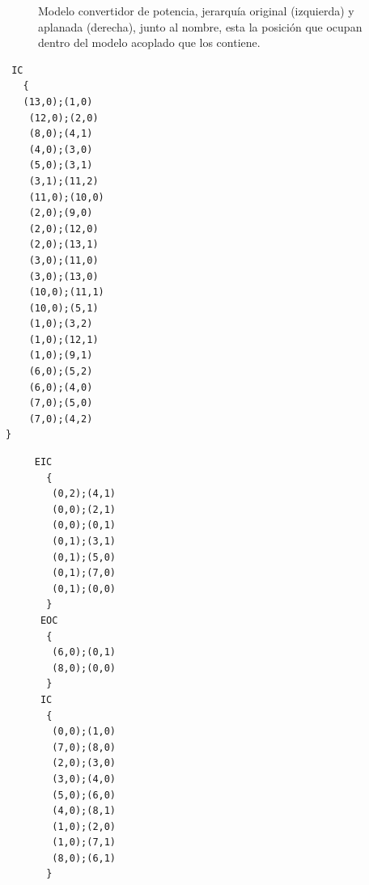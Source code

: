 \documentclass{beamer}
\begin{document}
\begin{frame}[fragile]
\begin{figure}[H]
{\begin{minipage}[t][][b]{.59\textwidth}
        \end{minipage}%
}
        \caption{Modelo convertidor de potencia, jerarquía original (izquierda) y aplanada (derecha), junto al nombre, esta la posición que ocupan dentro del modelo acoplado que los contiene.}
        \label{fig:coupled-tree}
\end{figure}
\end{frame}

\begin{frame}[fragile]
\begin{minipage}[t]{0.5\linewidth}
\centering
\begin{verbatim}
 IC
   {
   (13,0);(1,0)
    (12,0);(2,0)
    (8,0);(4,1)
    (4,0);(3,0)
    (5,0);(3,1)
    (3,1);(11,2)
    (11,0);(10,0)
    (2,0);(9,0)
    (2,0);(12,0)
    (2,0);(13,1)
    (3,0);(11,0)
    (3,0);(13,0)
    (10,0);(11,1)
    (10,0);(5,1)
    (1,0);(3,2)
    (1,0);(12,1)
    (1,0);(9,1)
    (6,0);(5,2)
    (6,0);(4,0)
    (7,0);(5,0)
    (7,0);(4,2)
}
\end{verbatim}
\end{minipage}
\begin{minipage}[t]{0.5\linewidth}
\begin{verbatim}
     EIC
       {
        (0,2);(4,1)
        (0,0);(2,1)
        (0,0);(0,1)
        (0,1);(3,1)
        (0,1);(5,0)
        (0,1);(7,0)
        (0,1);(0,0)
       }
      EOC
       {
        (6,0);(0,1)
        (8,0);(0,0)
       }
      IC
       {
        (0,0);(1,0)
        (7,0);(8,0)
        (2,0);(3,0)
        (3,0);(4,0)
        (5,0);(6,0)
        (4,0);(8,1)
        (1,0);(2,0)
        (1,0);(7,1)
        (8,0);(6,1)
       }
\end{verbatim}
\end{minipage}
\end{frame}
\end{document}
